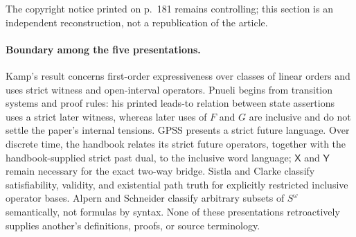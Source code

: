 The copyright notice printed on p.~181 remains controlling; this section is an
independent reconstruction, not a republication of the article.

\paragraph{Boundary among the five presentations.}
Kamp's result concerns first-order expressiveness over classes of linear orders
and uses strict witness and open-interval operators.  Pnueli begins from
transition systems and proof rules: his printed leads-to relation between state
assertions uses a strict later witness, whereas later uses of \(F\) and \(G\)
are inclusive and do not settle the paper's internal tensions.  GPSS presents
a strict future language.  Over discrete time, the handbook relates its strict
future operators, together with the handbook-supplied strict past dual, to the
inclusive word language; \(\mathsf X\) and \(\mathsf Y\) remain necessary for
the exact two-way bridge.  Sistla and Clarke classify satisfiability, validity,
and existential path truth for explicitly restricted inclusive operator
bases.  Alpern and Schneider classify arbitrary subsets of \(S^\omega\)
semantically, not formulas by syntax.  None of these presentations
retroactively supplies another's definitions, proofs, or source terminology.
